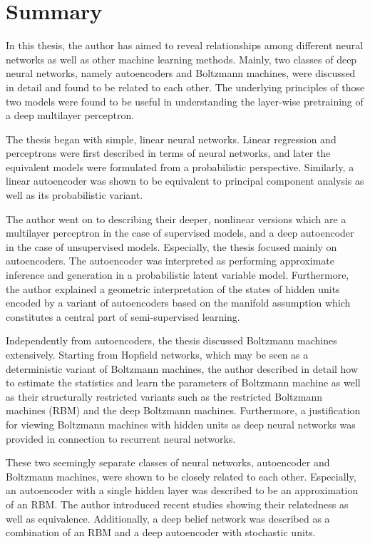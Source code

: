 \documentclass{now}
\begin{document}
\section{Summary}

In this thesis, the author has aimed to reveal relationships
among different neural networks as well as other
machine learning methods. Mainly, two classes of deep neural
networks, namely autoencoders and Boltzmann machines, were
discussed in detail and found to be related to each other.
The underlying principles of those two models were found to
be useful in understanding the layer-wise pretraining of a deep
multilayer perceptron.

The thesis began with simple, linear neural networks.
Linear regression and perceptrons were first described in
terms of neural networks, and later the equivalent models
were formulated from a probabilistic perspective. Similarly, a
linear autoencoder was shown to be equivalent to principal
component analysis as well as its probabilistic variant.

The author went on to describing their deeper, nonlinear
versions which are a multilayer perceptron in the case of
supervised models, and a deep autoencoder in the case of
unsupervised models. Especially, the thesis focused mainly
on autoencoders. The autoencoder was interpreted as
performing approximate inference and generation in a
probabilistic latent variable model.  Furthermore, the
author explained a geometric interpretation of the states of
hidden units encoded by a variant of autoencoders based on
the manifold assumption which constitutes a central part of
semi-supervised learning.

Independently from autoencoders, the thesis discussed
Boltzmann machines extensively. Starting from Hopfield
networks, which may be seen as a deterministic variant of
Boltzmann machines, the author described in detail
how to estimate the statistics and learn the parameters of Boltzmann
machine as well as their structurally restricted variants
such as the restricted Boltzmann machines (RBM) and the deep
Boltzmann machines. Furthermore, a justification for viewing
Boltzmann machines with hidden units as deep neural networks
was provided in connection to recurrent neural networks.

These two seemingly separate classes of neural networks,
autoencoder and Boltzmann machines, were shown to be closely
related to each other. Especially, an autoencoder with a
single hidden layer was described to be an approximation of
an RBM. The author introduced recent studies showing their
relatedness as well as equivalence. Additionally, a deep
belief network was described as a combination of an RBM and
a deep autoencoder with stochastic units.
\end{document}
